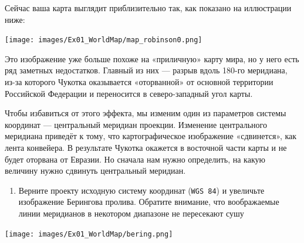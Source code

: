 \documentclass[
  12pt,
]{book}
\providecommand{\tightlist}{%
  \setlength{\itemsep}{0pt}\setlength{\parskip}{0pt}}
\begin{document}
Сейчас ваша карта выглядит приблизительно так, как показано на иллюстрации ниже:

\texttt{[image: images/Ex01\_WorldMap/map\_robinson0.png]}

Это изображение уже больше похоже на «приличную» карту мира, но у него есть ряд заметных недостатков. Главный из них --- разрыв вдоль 180-го меридиана, из-за которого Чукотка оказывается «оторванной» от основной территории Российской Федерации и переносится в северо-западный угол карты.

Чтобы избавиться от этого эффекта, мы изменим один из параметров системы координат --- центральный меридиан проекции. Изменение центрального меридиана приведёт к тому, что картографическое изображение «сдвинется», как лента конвейера. В результате Чукотка окажется в восточной части карты и не будет оторвана от Евразии. Но сначала нам нужно определить, на какую величину нужно сдвинуть центральный меридиан.

\begin{enumerate}
\def\labelenumi{\arabic{enumi}.}
\setcounter{enumi}{3}
\tightlist
\item
  Верните проекту исходную систему координат (\texttt{WGS\ 84}) и увеличьте изображение Берингова пролива. Обратите внимание, что воображаемые линии меридианов в некотором диапазоне не пересекают сушу
\end{enumerate}

\texttt{[image: images/Ex01\_WorldMap/bering.png]}
\end{document}
